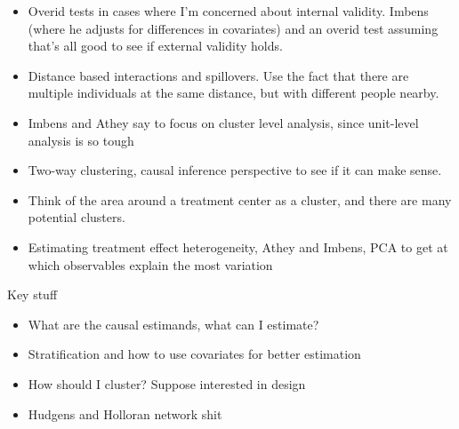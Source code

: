 \documentclass[12pt]{article}
\theoremstyle{plain}
\theoremstyle{definition}
\theoremstyle{remark}
\begin{document}
\begin{itemize}
  \item
    Overid tests in cases where I'm concerned about internal validity.
    Imbens (where he adjusts for differences in covariates) and
    an overid test assuming that's all good to see if external validity
    holds.

  \item
    Distance based interactions and spillovers.
    Use the fact that there are multiple individuals at the same
    distance, but with different people nearby.

  \item
    Imbens and Athey say to focus on cluster level analysis, since
    unit-level analysis is so tough

  \item
    Two-way clustering, causal inference perspective to see if it can
    make sense.

  \item
    Think of the area around a treatment center as a cluster, and there
    are many potential clusters.

  \item Estimating treatment effect heterogeneity, Athey and Imbens, PCA
    to get at which observables explain the most variation
\end{itemize}
Key stuff
\begin{itemize}
  \item What are the causal estimands, what can I estimate?
  \item Stratification and how to use covariates for better estimation
  \item How should I cluster?
    Suppose interested in design
  \item Hudgens and Holloran network shit
\end{itemize}
\end{document}
